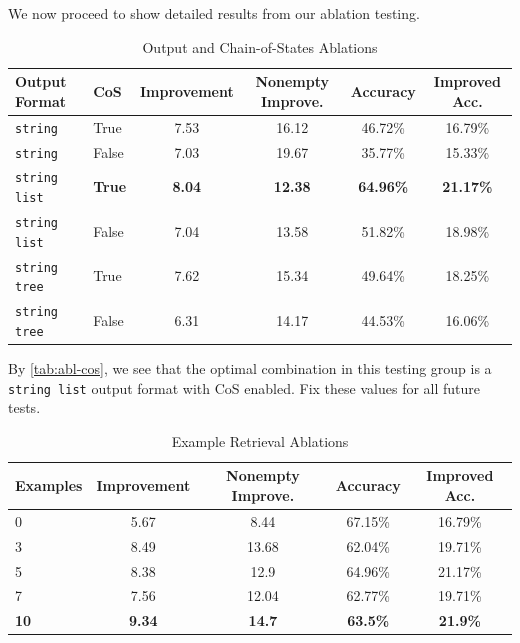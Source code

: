

We now proceed to show detailed results from our ablation testing.


\begin{table}[ht]
\caption{Output and Chain-of-States Ablations}
\label{tab:abl-cos}
\centering
\small
\begin{tabular}{ll|cccc}
\toprule
Output Format & CoS & Improvement& Nonempty Improve.& Accuracy & Improved Acc.\\
\midrule
\texttt{string} & True & 7.53 & 16.12 & 46.72\% & 16.79\% \\
\texttt{string}&False & 7.03 & 19.67 & 35.77\% & 15.33\% \\
\texttt{string list}&\textbf{True} & \textbf{8.04} & \textbf{12.38} & \textbf{64.96\%} & \textbf{21.17\%} \\
\texttt{string list}&False & 7.04 & 13.58 & 51.82\% & 18.98\% \\
\texttt{string tree}&True & 7.62 & 15.34 & 49.64\% & 18.25\% \\
\texttt{string tree}&False & 6.31 & 14.17 & 44.53\% & 16.06\% \\
\bottomrule
\end{tabular}
\end{table}




By \autoref{tab:abl-cos}, we see that the optimal combination in this testing group is a \texttt{string list} output format with CoS enabled. Fix these values for all future tests.






\begin{table}[h]
\caption{Example Retrieval Ablations}
\label{tab:abl-ex}
\centering
\small
\begin{tabular}{l|cccc}
\toprule
Examples & Improvement& Nonempty Improve.& Accuracy & Improved Acc.\\
\midrule
0 &  5.67 & 8.44 & 67.15\% & 16.79\% \\
3 &  8.49 & 13.68 & 62.04\% & 19.71\% \\
5 &  8.38 & 12.9 & 64.96\% & 21.17\% \\
7 &  7.56 & 12.04 & 62.77\% & 19.71\% \\
\textbf{10} &  \textbf{9.34} & \textbf{14.7} & \textbf{63.5\%} & \textbf{21.9\%} \\
\bottomrule
\end{tabular}
\end{table}


